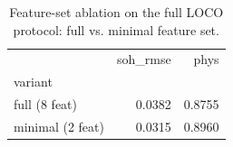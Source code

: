 \begin{table}
\caption{Feature-set ablation on the full LOCO protocol: full vs. minimal feature set.}
\label{tab:ablation_aggregation}
\begin{tabular}{lrr}
\toprule
 & soh\_rmse & phys \\
variant &  &  \\
\midrule
full (8 feat) & 0.0382 & 0.8755 \\
minimal (2 feat) & 0.0315 & 0.8960 \\
\bottomrule
\end{tabular}
\end{table}
